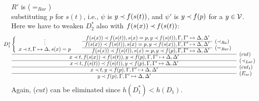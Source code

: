 \begin{PROOF}
\begin{LS}
\begin{LSA}
\begin{LSB}
\begin{LSC}
\begin{LSD}
%
\item $R'$ is ($=_{Rar}$)\\
substituting $p$ for $s(t)$, i.e., $\psi$ is $y\mathbin{\prec} f(s(t))$, and $\psi'$ is
 $y\mathbin{\prec} f(p)$ for a $y\in{\cal V}$. Here we have to weaken $D_2^*$ also with 
$f(s(x))\mathbin{\prec} f(s(t))$:
{\footnotesize
\[ \begin{array}{cl} \hspace*{-2em}
D_1^* \left \{ \begin{array}{c} \vdots \\ 
 x\Incl t, \GSD, s(x)=p \end{array} \right . \ \ \ \ 
\begin{array}{rl}
f(s(x))\Incl f(s(t)), s(x)=p, y\Incl f(s(t)), \Gamma, \Gamma' \Seq \Delta, \Delta' \\
 \cline{1-1}
f(s(x))\Incl f(s(t)), s(x)=p, y\Incl f(s(x)), \Gamma, \Gamma' \Seq \Delta, \Delta' 
 &   \rabove{\iRa} \\ \cline{1-1}
f(s(x))\Incl f(s(t)), s(x)=p, y\Incl f(p), \Gamma, \Gamma' \Seq \Delta, \Delta' 
 &   \raisebox{1.2ex}[1.5ex][0ex]{($=_{Rar}$)} 
 \end{array} \\ \cline{1-1}
x\Incl t, f(s(x))\Incl f(s(t)), y\Incl f(p), \Gamma, \Gamma' \Seq \Delta, \Delta' 
 &   \raisebox{1.2ex}[1.5ex][0ex]{($cut$)} \\ \cline{1-1}
x\Incl t, f(s(t))\Incl f(s(t)), y\Incl f(p), \Gamma, \Gamma' \Seq \Delta, \Delta' 
 &   \rabove{\iLar} \\ \cline{1-1}
x\Incl t, y\Incl f(p), \Gamma, \Gamma' \Seq \Delta, \Delta' 
 &   \raisebox{1.2ex}[1.5ex][0ex]{($cut_t$)} \\ \cline{1-1}
y\Incl f(p), \Gamma, \Gamma' \Seq \Delta, \Delta' 
 &   \rabove{\Esr}
\end{array} \]
}
Again, ($cut$) can be eliminated since $h(D_1^*)<h(D_1)$.
\end{LSD}
\end{LSC}
\end{LSB}
\end{LSA}
\end{LS}
\end{PROOF}
